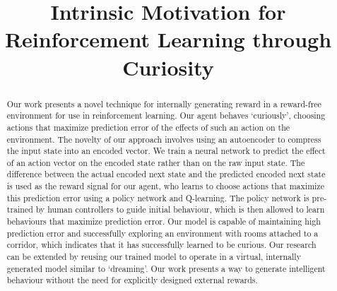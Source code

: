 \documentclass[conference, 12pt]{IEEEtran} %
\begin{document}
	\title{Intrinsic Motivation for Reinforcement Learning through Curiosity}

	\author{
		\and
		}

	\maketitle
	\begin{abstract}
	Our work presents a novel technique for internally generating reward in a reward-free environment for use in reinforcement learning. Our agent behaves `curiously', choosing actions that maximize prediction error of the effects of such an action on the environment. The novelty of our approach involves using an autoencoder to compress the input state into an encoded vector. We train a neural network to predict the effect of an action vector on the encoded state rather than on the raw input state. The difference between the actual encoded next state and the predicted encoded next state is used as the reward signal for our agent, who learns to choose actions that maximize this prediction error using a policy network and Q-learning. The policy network is pre-trained by human controllers to guide initial behaviour, which is then allowed to learn behaviours that maximize prediction error. Our model is capable of maintaining high prediction error and successfully exploring an environment with rooms attached to a corridor, which indicates that it has successfully learned to be curious. Our research can be extended by reusing our trained model to operate in a virtual, internally generated model similar to `dreaming'. Our work presents a way to generate intelligent behaviour without the need for explicitly designed external rewards.

	\end{abstract}
\end{document}
